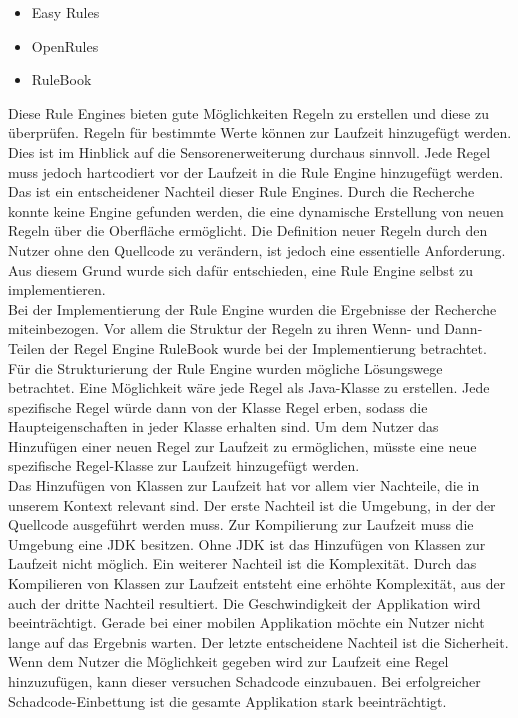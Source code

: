 \begin{itemize}                                                                                                               
	\item Easy Rules \cite{github:easyrules}
	\item OpenRules \cite{openrules}
	\item RuleBook \cite{github:rulebook}
\end{itemize}
Diese Rule Engines bieten gute Möglichkeiten Regeln zu erstellen und diese zu überprüfen. Regeln für bestimmte Werte können zur Laufzeit hinzugefügt werden. Dies ist im Hinblick auf die Sensorenerweiterung durchaus sinnvoll. Jede Regel muss jedoch hartcodiert vor der Laufzeit in die Rule Engine hinzugefügt werden. Das ist ein entscheidener Nachteil dieser Rule Engines. Durch die Recherche konnte keine Engine gefunden werden, die eine dynamische Erstellung von neuen Regeln über die Oberfläche ermöglicht. Die Definition neuer Regeln durch den Nutzer ohne den Quellcode zu verändern, ist jedoch eine essentielle Anforderung. Aus diesem Grund wurde sich dafür entschieden, eine Rule Engine selbst zu implementieren.\\
Bei der Implementierung der Rule Engine wurden die Ergebnisse der Recherche miteinbezogen. Vor allem die Struktur der Regeln zu ihren Wenn- und Dann-Teilen der Regel Engine RuleBook wurde bei der Implementierung betrachtet.\\
Für die Strukturierung der Rule Engine wurden mögliche Lösungswege betrachtet. Eine Möglichkeit wäre jede Regel als Java-Klasse zu erstellen. Jede spezifische Regel würde dann von der Klasse Regel erben, sodass die Haupteigenschaften in jeder Klasse erhalten sind. Um dem Nutzer das Hinzufügen einer neuen Regel zur Laufzeit zu ermöglichen, müsste
eine neue spezifische Regel-Klasse zur Laufzeit hinzugefügt werden.\\
Das Hinzufügen von Klassen zur Laufzeit hat vor allem vier Nachteile, die in unserem Kontext relevant sind. Der erste Nachteil ist die Umgebung, in der der Quellcode ausgeführt werden muss. Zur Kompilierung zur Laufzeit muss die Umgebung eine JDK besitzen. Ohne JDK ist das Hinzufügen von Klassen zur Laufzeit nicht möglich. Ein weiterer Nachteil ist die Komplexität. Durch das Kompilieren von Klassen zur Laufzeit entsteht eine erhöhte Komplexität, aus der auch der dritte Nachteil resultiert. Die Geschwindigkeit der Applikation wird beeinträchtigt. Gerade bei einer mobilen Applikation möchte ein Nutzer nicht lange auf das Ergebnis warten. Der letzte entscheidene Nachteil ist die Sicherheit. Wenn dem Nutzer die Möglichkeit gegeben wird zur Laufzeit eine Regel hinzuzufügen, kann dieser versuchen Schadcode einzubauen. Bei erfolgreicher Schadcode-Einbettung ist die gesamte Applikation stark beeinträchtigt.\\

